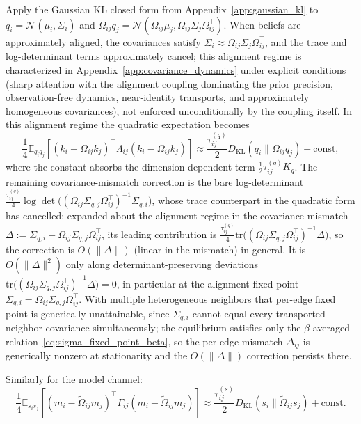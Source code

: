 \documentclass[11pt]{article}
\begin{document}
Apply the Gaussian KL closed form from Appendix~\ref{app:gaussian_kl} to $q_i = \mathcal{N}(\mu_i,\Sigma_i)$ and $\Omega_{ij}q_j = \mathcal{N}(\Omega_{ij}\mu_j, \Omega_{ij}\Sigma_j\Omega_{ij}^\top)$. When beliefs are approximately aligned, the covariances satisfy $\Sigma_i \approx \Omega_{ij}\Sigma_j\Omega_{ij}^\top$, and the trace and log-determinant terms approximately cancel; this alignment regime is characterized in Appendix~\ref{app:covariance_dynamics} under explicit conditions (sharp attention with the alignment coupling dominating the prior precision, observation-free dynamics, near-identity transports, and approximately homogeneous covariances), not enforced unconditionally by the coupling itself. In this alignment regime the quadratic expectation becomes
\begin{equation}
\frac{1}{4}\mathbb{E}_{q_i q_j}
[(k_i-\Omega_{ij}k_j)^\top\Lambda_{ij}(k_i-\Omega_{ij}k_j)]
\approx
\frac{\tau^{(q)}_{ij}}{2}D_{\mathrm{KL}}(q_i\|\Omega_{ij}q_j)+\text{const},
\end{equation}
where the constant absorbs the dimension-dependent term $\tfrac{1}{2}\tau^{(q)}_{ij}K_q$. The remaining covariance-mismatch correction is the bare log-determinant $\tfrac{\tau^{(q)}_{ij}}{4}\log\det\big((\Omega_{ij}\Sigma_{q,j}\Omega_{ij}^\top)^{-1}\Sigma_{q,i}\big)$, whose trace counterpart in the quadratic form has cancelled; expanded about the alignment regime in the covariance mismatch $\Delta := \Sigma_{q,i} - \Omega_{ij}\Sigma_{q,j}\Omega_{ij}^\top$, its leading contribution is $\tfrac{\tau^{(q)}_{ij}}{4}\mathrm{tr}\big((\Omega_{ij}\Sigma_{q,j}\Omega_{ij}^\top)^{-1}\Delta\big)$, so the correction is $O(\|\Delta\|)$ (linear in the mismatch) in general. It is $O(\|\Delta\|^2)$ only along determinant-preserving deviations $\mathrm{tr}\big((\Omega_{ij}\Sigma_{q,j}\Omega_{ij}^\top)^{-1}\Delta\big)=0$, in particular at the alignment fixed point $\Sigma_{q,i}=\Omega_{ij}\Sigma_{q,j}\Omega_{ij}^\top$. With multiple heterogeneous neighbors that per-edge fixed point is generically unattainable, since $\Sigma_{q,i}$ cannot equal every transported neighbor covariance simultaneously; the equilibrium satisfies only the $\beta$-averaged relation~\eqref{eq:sigma_fixed_point_beta}, so the per-edge mismatch $\Delta_{ij}$ is generically nonzero at stationarity and the $O(\|\Delta\|)$ correction persists there.

Similarly for the model channel:
\begin{equation}
\frac{1}{4}\mathbb{E}_{s_i s_j}
[(m_i-\tilde{\Omega}_{ij}m_j)^\top\Gamma_{ij}(m_i-\tilde{\Omega}_{ij}m_j)]
\approx
\frac{\tau^{(s)}_{ij}}{2}D_{\mathrm{KL}}(s_i\|\tilde{\Omega}_{ij}s_j)+\text{const}.
\end{equation}
\end{document}
